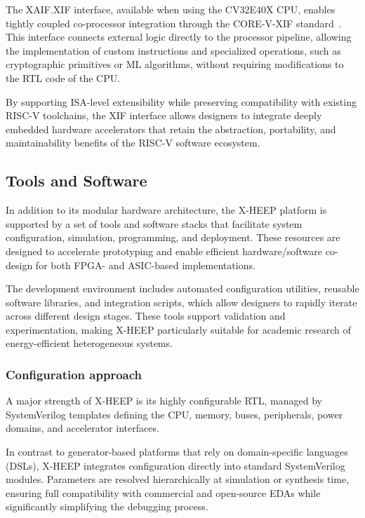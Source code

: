                The XAIF.XIF interface, available when using the \mbox{CV32E40X} CPU, enables tightly coupled co-processor integration through the CORE-V-XIF standard~\cite{xif}. This interface connects external logic directly to the processor pipeline, allowing the implementation of custom instructions and specialized operations, such as cryptographic primitives or ML algorithms, without requiring modifications to the RTL code of the CPU.

                By supporting ISA-level extensibility while preserving compatibility with existing RISC-V toolchains, the XIF interface allows designers to integrate deeply embedded hardware accelerators that retain the abstraction, portability, and maintainability benefits of the RISC-V software ecosystem.

        \subsection{Tools and Software}

            In addition to its modular hardware architecture, the \mbox{X-HEEP} platform is supported by a set of tools and software stacks that facilitate system configuration, simulation, programming, and deployment. These resources are designed to accelerate prototyping and enable efficient hardware/software co-design for both FPGA- and ASIC-based implementations.

            The development environment includes automated configuration utilities, reusable software libraries, and integration scripts, which allow designers to rapidly iterate across different design stages. These tools support validation and experimentation, making \mbox{X-HEEP} particularly suitable for academic research of energy-efficient heterogeneous systems.

            \subsubsection*{Configuration approach}

                A major strength of \mbox{X-HEEP} is its highly configurable RTL, managed by SystemVerilog templates defining the CPU, memory, buses, peripherals, power domains, and accelerator interfaces.
                
                In contrast to generator-based platforms that rely on domain-specific languages (DSLs), \mbox{X-HEEP} integrates configuration directly into standard SystemVerilog modules. Parameters are resolved hierarchically at simulation or synthesis time, ensuring full compatibility with commercial and open-source EDAs while significantly simplifying the debugging process.
                

